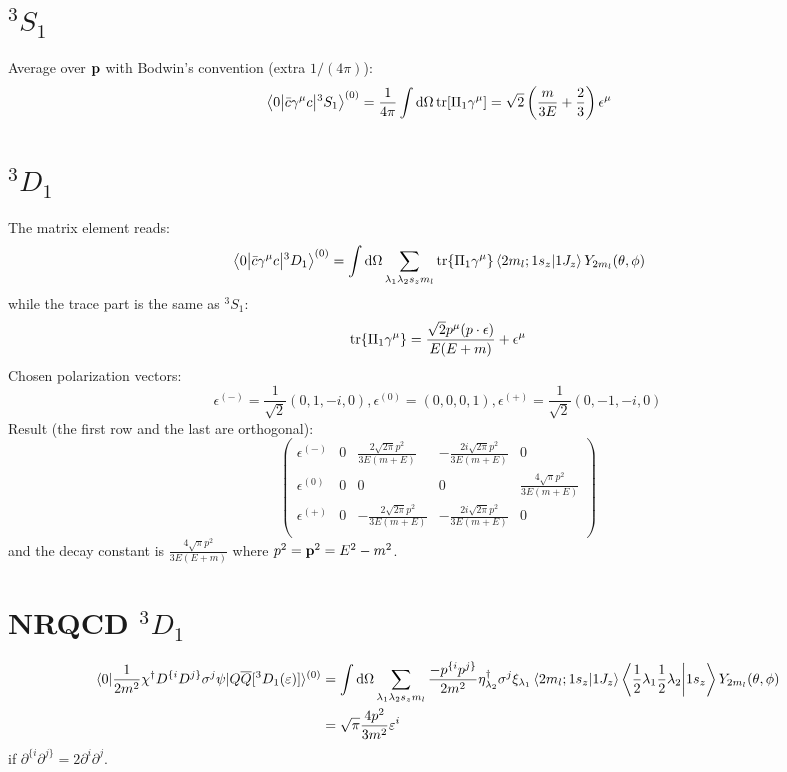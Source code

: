 \documentclass{article}
\newcommand{\gm}{\gamma^{\mu}}
\newcommand{\la}{\lambda}
\begin{document}
\section{$^3S_1$}
Average over $\vb{p}$ with Bodwin's convention (extra $1/(4\pi)$):
$$\mel{0}{\bar c\gm c}{^3S_1}^{(0)}=\frac{1}{4\pi}\int\dd\Omega\tr[\Pi_1\gm]=\sqrt{2}\left(\frac{m}{3 E}+\frac{2}{3}\right)\epsilon^{\mu}$$
\section{$^3D_1$}
The matrix element reads:
$$\mel{0}{\bar c\gm c}{^3D_1}^{(0)}=\int\dd\Omega\sum_{\la_1\la_2 s_zm_l}\tr{\Pi_1\gm}\braket{2m_l;1s_z}{1J_z}Y_{2m_l}(\theta,\phi)$$
while the trace part is the same as $^3S_1$:
$$\tr{\Pi_1\gm}=\frac{\sqrt{2}p^{\mu}(p\cdot\epsilon)}{E(E+m)}+\epsilon^{\mu}$$
Chosen polarization vectors: 
$$\epsilon^{(-)}=\frac{1}{\sqrt{2}}(0,1,-i,0),\epsilon^{(0)}=(0,0,0,1),\epsilon^{(+)}=\frac{1}{\sqrt{2}}(0,-1,-i,0)$$
Result (the first row and the last are orthogonal):  
$$\left(
\begin{array}{c|cccc}
    \epsilon^{(-)} & 0 & \frac{2 \sqrt{2 \pi } p^2}{3 E (m+E)} & -\frac{2 i \sqrt{2 \pi } p^2}{3 E (m+E)} & 0 \\\hline
    \epsilon^{(0)} & 0 & 0 & 0 & \frac{4 \sqrt{\pi } p^2}{3 E (m+E)} \\\hline
    \epsilon^{(+)} & 0 & -\frac{2 \sqrt{2 \pi } p^2}{3 E (m+E)} & -\frac{2 i \sqrt{2 \pi } p^2}{3 E (m+E)} & 0 \\
\end{array}
\right)$$
and the decay constant is $\frac{4 \sqrt{\pi } p^2}{3 E (E+m)}$ where $p^2=\vb{p}^2 =E^2-m^2$. 

\section{NRQCD $^3D_1$}
\begin{align}
    \langle 0 | \frac {1} {2 m^{2}} \chi^{\dagger} D^{\{i} D^{j \}} \sigma^{j} \psi | Q \overline {Q} [^{3} D_{1} (\varepsilon) ] \rangle^{(0)} &=\int\dd\Omega\sum_{\la_1\la_2 s_zm_l}\frac{-p^{\{i}p^{j\}}}{2m^2}\eta^\dagger_{\lambda_2}\sigma^j\xi_{\lambda_1}\braket{2m_l;1s_z}{1J_z}\braket{\frac{1}{2}\lambda_1\frac{1}{2}\lambda_2}{1s_z}Y_{2m_l}(\theta,\phi)\\
    &=  \sqrt {\pi} \frac {4 p^{2}} {3 m^{2}} \varepsilon^{i}
\end{align}
if $\partial^{\{i} \partial^{j \}}=2\partial^{i} \partial^{j }$. 



\end{document}
